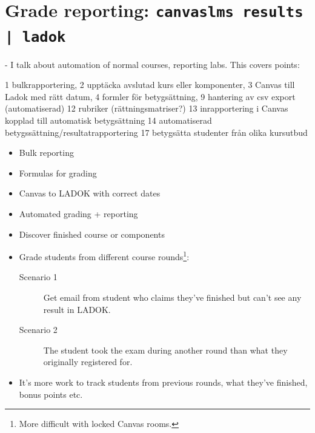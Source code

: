 \section[Grade reporting]{Grade reporting: \texttt{canvaslms results | ladok}}

- I talk about automation of normal courses, reporting labs. This covers  
points:

    1 bulkrapportering,
    2 upptäcka avslutad kurs eller komponenter,
    3 Canvas till Ladok med rätt datum,
    4 formler för betygsättning,
    9 hantering av csv export (automatiserad)
    12 rubriker (rättningsmatriser?)
    13 inrapportering i Canvas kopplad till automatisk betygsättning
    14 automatiserad betygssättning/resultatrapportering
    17 betygsätta studenter från olika kursutbud

\begin{frame}[fragile]
  \begin{example}[Reporting]
    \begin{itemize}
      \item {Bulk reporting}
      \item {Formulas for grading}
      \item {Canvas to LADOK with correct dates}
      \item {Automated grading + reporting}
    \end{itemize}
  \end{example}
\end{frame}

\begin{frame}
  \begin{example}
    \begin{itemize}
      \item {Discover finished course or components}
      \item {Grade students from different course rounds}\footnote{%
          More difficult with locked Canvas rooms.
        }:
        \begin{description}
          \item[Scenario 1] {Get email from student who claims they've 
            finished but can't see any result in LADOK.}

          \item[Scenario 2] The student took the exam during another round than 
            what they originally registered for.
        \end{description}

      \item {It's more work to track students from previous rounds, what 
        they've finished, bonus points etc.}
    \end{itemize}
  \end{example}
\end{frame}

